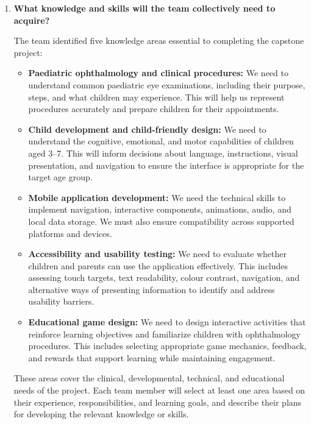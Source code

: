 \documentclass[10pt]{article}
\begin{document}
\begin{enumerate}
    \item \textbf{What knowledge and skills will the team collectively
    need to acquire?}

    The team identified five knowledge areas essential to completing
    the capstone project:

    \begin{itemize}
        \item \textbf{Paediatric ophthalmology and clinical procedures:}
        We need to understand common paediatric eye examinations,
        including their purpose, steps, and what children may experience.
        This will help us represent procedures accurately and prepare
        children for their appointments.

        \item \textbf{Child development and child-friendly design:}
        We need to understand the cognitive, emotional, and motor
        capabilities of children aged 3--7. This will inform decisions
        about language, instructions, visual presentation, and navigation
        to ensure the interface is appropriate for the target age group.

        \item \textbf{Mobile application development:}
        We need the technical skills to implement navigation,
        interactive components, animations, audio, and local data
        storage. We must also ensure compatibility across supported
        platforms and devices.

        \item \textbf{Accessibility and usability testing:}
        We need to evaluate whether children and parents can use the
        application effectively. This includes assessing touch targets,
        text readability, colour contrast, navigation, and alternative
        ways of presenting information to identify and address usability
        barriers.

        \item \textbf{Educational game design:}
        We need to design interactive activities that reinforce learning
        objectives and familiarize children with ophthalmology procedures.
        This includes selecting appropriate game mechanics, feedback,
        and rewards that support learning while maintaining engagement.
    \end{itemize}

    These areas cover the clinical, developmental, technical, and
    educational needs of the project. Each team member will select
    at least one area based on their experience, responsibilities,
    and learning goals, and describe their plans for developing
    the relevant knowledge or skills.


\end{enumerate}
\end{document}
